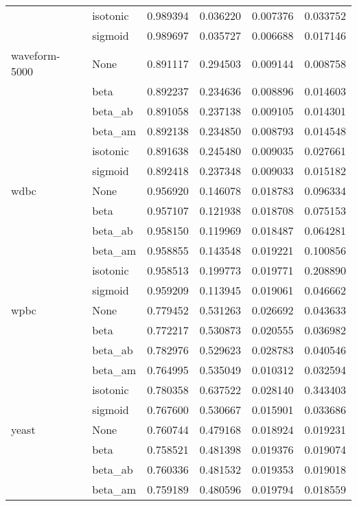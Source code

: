 \begin{tabular}{llrrrr}
        & isotonic &  0.989394 &  0.036220 &  0.007376 &  0.033752 \\
        & sigmoid &  0.989697 &  0.035727 &  0.006688 &  0.017146 \\
waveform-5000 & None &  0.891117 &  0.294503 &  0.009144 &  0.008758 \\
        & beta &  0.892237 &  0.234636 &  0.008896 &  0.014603 \\
        & beta\_ab &  0.891058 &  0.237138 &  0.009105 &  0.014301 \\
        & beta\_am &  0.892138 &  0.234850 &  0.008793 &  0.014548 \\
        & isotonic &  0.891638 &  0.245480 &  0.009035 &  0.027661 \\
        & sigmoid &  0.892418 &  0.237348 &  0.009033 &  0.015182 \\
wdbc & None &  0.956920 &  0.146078 &  0.018783 &  0.096334 \\
        & beta &  0.957107 &  0.121938 &  0.018708 &  0.075153 \\
        & beta\_ab &  0.958150 &  0.119969 &  0.018487 &  0.064281 \\
        & beta\_am &  0.958855 &  0.143548 &  0.019221 &  0.100856 \\
        & isotonic &  0.958513 &  0.199773 &  0.019771 &  0.208890 \\
        & sigmoid &  0.959209 &  0.113945 &  0.019061 &  0.046662 \\
wpbc & None &  0.779452 &  0.531263 &  0.026692 &  0.043633 \\
        & beta &  0.772217 &  0.530873 &  0.020555 &  0.036982 \\
        & beta\_ab &  0.782976 &  0.529623 &  0.028783 &  0.040546 \\
        & beta\_am &  0.764995 &  0.535049 &  0.010312 &  0.032594 \\
        & isotonic &  0.780358 &  0.637522 &  0.028140 &  0.343403 \\
        & sigmoid &  0.767600 &  0.530667 &  0.015901 &  0.033686 \\
yeast & None &  0.760744 &  0.479168 &  0.018924 &  0.019231 \\
        & beta &  0.758521 &  0.481398 &  0.019376 &  0.019074 \\
        & beta\_ab &  0.760336 &  0.481532 &  0.019353 &  0.019018 \\
        & beta\_am &  0.759189 &  0.480596 &  0.019794 &  0.018559 \\

\end{tabular}

